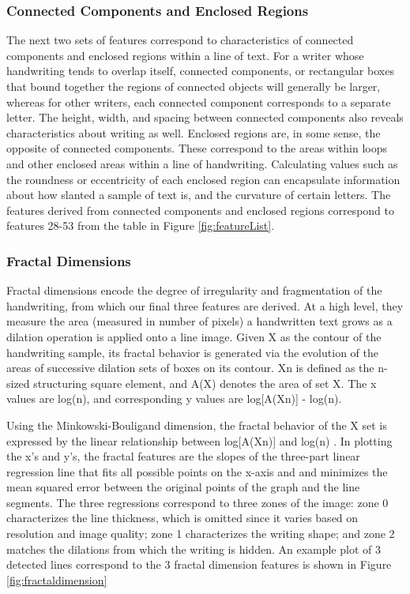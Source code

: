 \documentclass[paper=a4, fontsize=11pt]{scrartcl} %
\numberwithin{equation}{section} %
\numberwithin{figure}{section} %
\numberwithin{table}{section} %
\begin{document}
\subsubsection{Connected Components and Enclosed Regions}
The next two sets of features correspond to characteristics of
connected components and enclosed regions within a line of text. For a
writer whose handwriting tends to overlap itself, connected
components, or rectangular boxes that bound together the regions of
connected objects will generally be larger, whereas for other writers,
each connected component corresponds to a separate letter. The height,
width, and spacing between connected components also reveals
characteristics about writing as well. Enclosed regions are, in some
sense, the opposite of connected components. These correspond to the
areas within loops and other enclosed areas within a line of
handwriting. Calculating values such as the roundness or eccentricity
of each enclosed region can encapsulate information about how slanted
a sample of text is, and the curvature of certain letters. The
features derived from connected components and enclosed regions
correspond to features 28-53 from the table in Figure
\ref{fig:featureList}.

\subsubsection{Fractal Dimensions}
Fractal dimensions encode the degree of irregularity and fragmentation
of the handwriting, from which our final three features are
derived\cite{FractalDimensions}. At a high level, they measure the
area (measured in number of pixels) a handwritten text grows as a
dilation operation is applied onto a line image. Given X as the
contour of the handwriting sample, its fractal behavior is generated
via the evolution of the areas of successive dilation sets of boxes on
its contour. Xn is defined as the n-sized structuring square element,
and A(X) denotes the area of set X. The x values are log(n), and
corresponding y values are log[A(Xn)] - log(n).

Using the Minkowski-Bouligand dimension, the fractal behavior of the X
set is expressed by the linear relationship between log[A(Xn)] and
log(n) \cite{SyntheticParameters}. In plotting the x’s and y’s, the
fractal features are the slopes of the three-part linear regression
line that fits all possible points on the x-axis and and minimizes the
mean squared error between the original points of the graph and the
line segments\cite{GeometricalFeatures}.  The three regressions
correspond to three zones of the image: zone 0 characterizes the line
thickness, which is omitted since it varies based on resolution and
image quality; zone 1 characterizes the writing shape; and zone 2
matches the dilations from which the writing is hidden. An example
plot of 3 detected lines correspond to the 3 fractal dimension
features is shown in Figure \ref{fig:fractaldimension}
\end{document}
